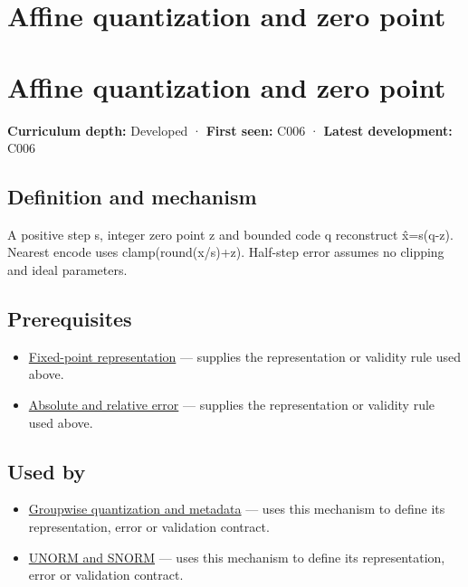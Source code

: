 \hypertarget{appendix-d5da3eaabaef}{}
\section*{Affine quantization and zero point}
\section{Affine quantization and zero point}\label{affine-quantization-and-zero-point}

\textbf{Curriculum depth:} Developed · \textbf{First seen:} C006 · \textbf{Latest development:} C006

\subsection{Definition and mechanism}\label{definition-and-mechanism}

A positive step s, integer zero point z and bounded code q reconstruct x̂=s(q-z). Nearest encode uses clamp(round(x/s)+z). Half-step error assumes no clipping and ideal parameters.

\subsection{Prerequisites}\label{prerequisites}

\begin{itemize}
\tightlist
\item
  \hyperref[appendix-1d0dbe8924cc]{Fixed-point representation} --- supplies the representation or validity rule used above.
\item
  \hyperref[appendix-3ae74e89b4e6]{Absolute and relative error} --- supplies the representation or validity rule used above.
\end{itemize}

\subsection{Used by}\label{used-by}

\begin{itemize}
\tightlist
\item
  \hyperref[appendix-638204c40e8b]{Groupwise quantization and metadata} --- uses this mechanism to define its representation, error or validation contract.
\item
  \hyperref[appendix-b2402c453dac]{UNORM and SNORM} --- uses this mechanism to define its representation, error or validation contract.
\end{itemize}


